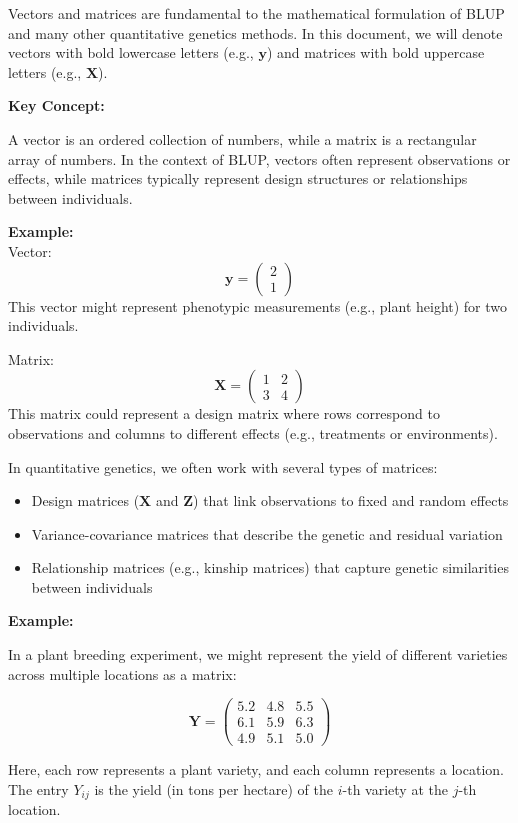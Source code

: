 \documentclass[12pt,a4paper]{article}
\newenvironment{keyconceptbox}[1][]
{\begin{basebox}[linecolor=uqblue]
\textbf{\color{uqblue}Key Concept:} \textit{#1}\par\noindent\ignorespaces}
{\end{basebox}}
\newenvironment{example}[1][]
{\begin{basebox}[linecolor=uqgold]
\textbf{\color{uqgold}Example:} \textit{#1}\par\noindent\ignorespaces}
{\end{basebox}}
\begin{document}
Vectors and matrices are fundamental to the mathematical formulation of BLUP and many other quantitative genetics methods. In this document, we will denote vectors with bold lowercase letters (e.g., $\mathbf{y}$) and matrices with bold uppercase letters (e.g., $\mathbf{X}$).

\begin{keyconceptbox}
A vector is an ordered collection of numbers, while a matrix is a rectangular array of numbers. In the context of BLUP, vectors often represent observations or effects, while matrices typically represent design structures or relationships between individuals.
\end{keyconceptbox}

\textbf{Example:}\\
Vector: $$\mathbf{y} = \begin{pmatrix} 2 \\ 1 \end{pmatrix}$$
This vector might represent phenotypic measurements (e.g., plant height) for two individuals.

Matrix: $$\mathbf{X} = \begin{pmatrix} 1 & 2 \\ 3 & 4 \end{pmatrix}$$
This matrix could represent a design matrix where rows correspond to observations and columns to different effects (e.g., treatments or environments).

In quantitative genetics, we often work with several types of matrices:
\begin{itemize}
    \item Design matrices ($\mathbf{X}$ and $\mathbf{Z}$) that link observations to fixed and random effects
    \item Variance-covariance matrices that describe the genetic and residual variation
    \item Relationship matrices (e.g., kinship matrices) that capture genetic similarities between individuals
\end{itemize}

\begin{example}
In a plant breeding experiment, we might represent the yield of different varieties across multiple locations as a matrix:

\[
\mathbf{Y} = \begin{pmatrix}
    5.2 & 4.8 & 5.5 \\
    6.1 & 5.9 & 6.3 \\
    4.9 & 5.1 & 5.0
\end{pmatrix}
\]

Here, each row represents a plant variety, and each column represents a location. The entry $Y_{ij}$ is the yield (in tons per hectare) of the $i$-th variety at the $j$-th location.
\end{example}
\end{document}
